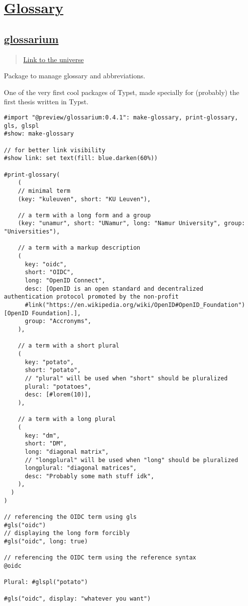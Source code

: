 \section{\texorpdfstring{\hyperref[glossary]{Glossary}}{Glossary}}\label{glossary}

\subsection{\texorpdfstring{\hyperref[glossarium]{glossarium}}{glossarium}}\label{glossarium}

\begin{quote}
\href{https://typst.app/universe/package/glossarium}{Link to the
universe}
\end{quote}

Package to manage glossary and abbreviations.

One of the very first cool packages of Typst, made specially for
(probably) the first thesis written in Typst.

\begin{verbatim}
#import "@preview/glossarium:0.4.1": make-glossary, print-glossary, gls, glspl
#show: make-glossary

// for better link visibility
#show link: set text(fill: blue.darken(60%))

#print-glossary(
    (
    // minimal term
    (key: "kuleuven", short: "KU Leuven"),

    // a term with a long form and a group
    (key: "unamur", short: "UNamur", long: "Namur University", group: "Universities"),

    // a term with a markup description
    (
      key: "oidc",
      short: "OIDC",
      long: "OpenID Connect",
      desc: [OpenID is an open standard and decentralized authentication protocol promoted by the non-profit
      #link("https://en.wikipedia.org/wiki/OpenID#OpenID_Foundation")[OpenID Foundation].],
      group: "Accronyms",
    ),

    // a term with a short plural
    (
      key: "potato",
      short: "potato",
      // "plural" will be used when "short" should be pluralized
      plural: "potatoes",
      desc: [#lorem(10)],
    ),

    // a term with a long plural
    (
      key: "dm",
      short: "DM",
      long: "diagonal matrix",
      // "longplural" will be used when "long" should be pluralized
      longplural: "diagonal matrices",
      desc: "Probably some math stuff idk",
    ),
  )
)

// referencing the OIDC term using gls
#gls("oidc")
// displaying the long form forcibly
#gls("oidc", long: true)

// referencing the OIDC term using the reference syntax
@oidc

Plural: #glspl("potato")

#gls("oidc", display: "whatever you want")
\end{verbatim}

